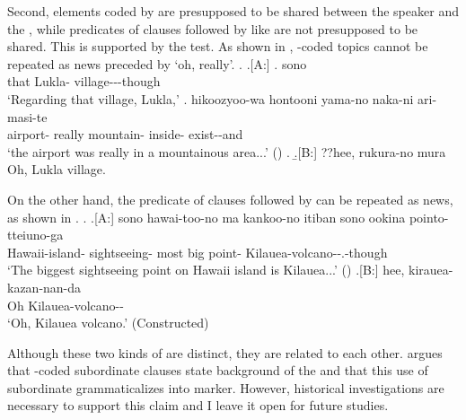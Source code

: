 Second,
 elements coded by  are presupposed to be shared between the speaker and the ,
while predicates of  clauses followed by  like \Last are not presupposed to be shared.
This is supported by the  test.
As shown in \Next, -coded topics cannot be repeated as news preceded by  `oh, really'.
%
\ex. \a.[A:]
 \ag. sono   \\
   that Lukla- village---though \\
   `Regarding that village, Lukla,'
  \bg. hikoozyoo-wa hontooni yama-no naka-ni ari-masi-te \\
    airport- really mountain- inside- exist--and \\
    `the airport was really in a mountainous area...'
    \hfill{()}
   \z.
   \b.[B:] ??hee, rukura-no mura \\
     Oh, Lukla village.
%

On the other hand,
the predicate of  clauses followed by  can be repeated as news, as shown in \Next.
%
\ex. \ag.[A:] sono hawai-too-no ma kankoo-no itiban sono ookina pointo-tteiuno-ga  \\
		 Hawaii-island-  sightseeing- most  big point- Kilauea-volcano--.-though \\
		`The biggest sightseeing point on Hawaii island is Kilauea...'
		\hfill{()}
	\bg.[B:] hee, kirauea-kazan-nan-da \\
	  Oh Kilauea-volcano--  \\
	  `Oh, Kilauea volcano.'
	  \hfill{(Constructed)}


Although these two kinds of  are distinct,
they are related to each other.
 argues that
-coded subordinate clauses state background of the  and
that this use of subordinate  grammaticalizes into  marker.
However, historical investigations are necessary to support this claim
and I leave it open for future studies.

